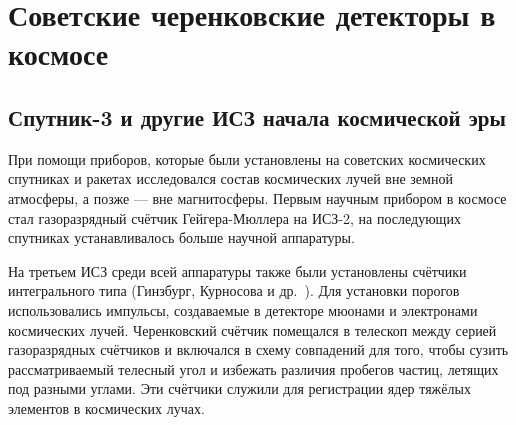 \documentclass[12pt,a4paper]{report} %
\begin{document}
\section{Советские черенковские детекторы в космосе}

\subsection{Спутник-3 и другие ИСЗ начала космической эры}

При помощи приборов, которые были установлены на советских космических спутниках и ракетах исследовался состав космических лучей вне земной атмосферы, а позже --- вне магнитосферы. Первым научным прибором в космосе стал газоразрядный счётчик Гейгера-Мюллера на ИСЗ-2, на последующих спутниках устанавливалось больше научной аппаратуры. 

На третьем ИСЗ среди всей аппаратуры также были установлены счётчики интегрального типа (Гинзбург, Курносова и др.~\cite{Ginzburg}).
Для установки порогов использовались импульсы, создаваемые в детекторе мюонами и электронами космических лучей. 
Черенковский счётчик помещался в телескоп между серией газоразрядных счётчиков и включался в схему совпадений для того, чтобы сузить рассматриваемый телесный угол и избежать различия пробегов частиц, летящих под разными углами. Эти счётчики служили для регистрации ядер тяжёлых элементов в космических лучах. 
\end{document}
